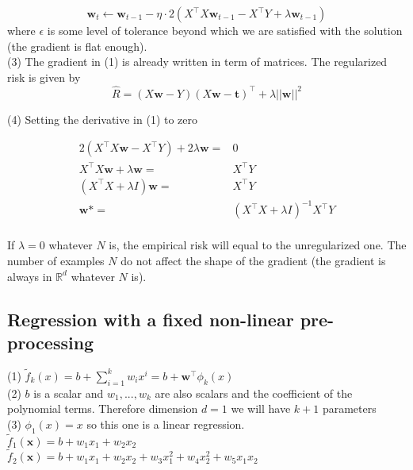 \documentclass[11pt,english]{article}
\newcommand{\real}{\mathbb{R}}
\begin{document}
       $$ \bm{w}_t \leftarrow \bm{w}_{t-1} - \eta \cdot 2(X^\top X\bm{w}_{t-1} - X^\top Y + \lambda \bm{w}_{t-1})
    $$
    where $\epsilon$ is some level of tolerance beyond which we are satisfied with the solution (the gradient is flat enough).\\

    (3) The gradient in (1) is already written in term of matrices. The regularized risk is given by
    $$
        \hat{R} = (X\bm{w}-Y)(X\bm{w}-\bm{t})^\top + \lambda ||\bm{w}||^2
    $$
    
    (4) Setting the derivative in (1) to zero
        
    \begin{equation}
        \begin{split}
            2(X^\top X\bm{w} - X^\top Y) + 2 \lambda \bm{w} =& 0 \\
            X^\top X\bm{w} + \lambda \bm{w} =& X^\top Y \\
            (X^\top X+ \lambda I) \bm{w} =& X^\top Y \\
             \bm{w}* =& (X^\top X+ \lambda I)^{-1}X^\top Y \\
        \end{split}
    \end{equation}

    If $\lambda=0$ whatever $N$ is, the empirical risk will equal to the unregularized one. The number of examples $N$ do not affect the shape of the gradient (the gradient is always in $\real^d$ whatever $N$ is).

    \subsection{Regression with a fixed non-linear pre-processing}

    (1) $\tilde{f}_k (x)=b + \sum_{i=1}^k w_i x^i = b + \bm{w}^\top \phi_k(x)$\\

    (2) $b$ is a scalar and $w_1,...,w_k$ are also scalars and the coefficient of the polynomial terms. Therefore dimension $d=1$ we will have $k+1$ parameters\\
    
    (3) $\phi_1(x)=x$ so this one is a linear regression. \\

    $\tilde{f}_1 (\bm{x})=b + w_1 x_1 + w_2 x_2$\\

    $\tilde{f}_2 (\bm{x})=b + w_1 x_1 + w_2 x_2 + w_3 x_1^2 + w_4 x_2^2 + w_5 x_1 x_2$\\
\end{document}
